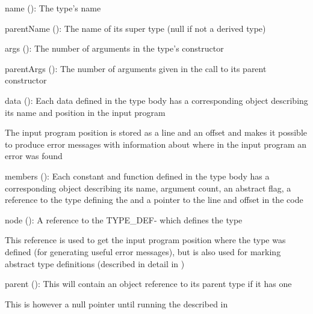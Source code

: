 \begin{dlist}
  \item name (): The type's name
  \item parentName (): The name of its super type (null if
    not a derived type)  
  \item args (): The number of arguments in the type's
    constructor
  \item parentArgs (): The number of arguments given in the
    call to its parent constructor
  \item data (): Each data defined in the type body has a
    corresponding  object describing its name and position in the
    input program
  \begin{dlist}
    \item The input program position is stored as a line and an offset and makes
      it possible to produce error messages with information about where in the
      input program an error was found
  \end{dlist}
  \item members (): Each constant and function defined
    in the type body has a corresponding  object describing its
    name, argument count, an abstract flag, a 
    reference to the type defining the  and a pointer to the line
    and offset in the code
  \item node (): A reference to the
    TYPE\_DEF- which defines the type
  \begin{dlist}
    \item This reference is used to get the input program position where the
      type was defined (for generating useful error messages), but is also used
      for marking abstract type definitions (described in detail in
      ) 
  \end{dlist}
  \item parent (): This will contain an object
    reference to its parent type if it has one
  \begin{dlist}
    \item This is however a null pointer until running the
       described in 
  \end{dlist} 
\end{dlist}

